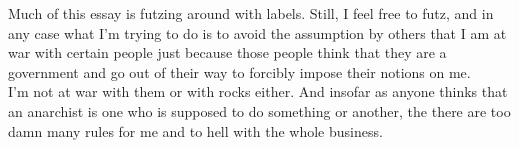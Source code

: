 Much of this essay is futzing around with labels. Still, I feel free to futz, and in any case what I'm trying to do is to avoid the assumption by others that I am at war with certain people just because those people think that they are a government and go out of their way to forcibly impose their notions on me.\\
I'm not at war with them or with rocks either. And insofar as anyone thinks that an anarchist is one who is supposed to do something or another, the there are too damn many rules for me and to hell with the whole business.
